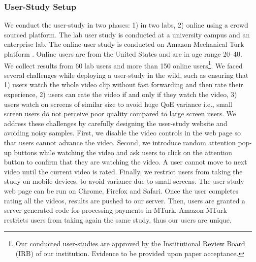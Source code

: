 \subsubsection{User-Study Setup}
We conduct the user-study in two phases: 1) in two labs, 2) online using a crowd sourced platform. The lab user study is conducted at a university campus and an enterprise lab. The online user study is conducted on Amazon Mechanical Turk platform \cite{turk-amazon}. Online users are from the United States and are in age range 20--40. We collect results from 60 lab users and more than 150 online users\footnote{Our conducted user-studies are approved by the Institutional Review Board (IRB) of our institution. Evidence to be provided upon paper acceptance.}. We faced several challenges  while deploying a user-study in the wild, such as ensuring that 1) users watch the whole video clip without fast forwarding and then rate their experience, 2) users can rate the video if and only if they watch the video, 3) users watch on screens of similar size  to avoid huge QoE variance i.e., small screen users do not perceive poor quality compared to large screen users. We address these challenges by carefully designing the user-study website and avoiding noisy samples. First, we disable the video controls in the web page so that users cannot advance the video. Second, we introduce random attention pop-up buttons while watching the video and ask users to click on the attention button to confirm that they are watching the video. A user cannot move to next video until the current video is rated. Finally, we restrict users from taking the study on mobile devices, to avoid variance due to small screens. The user-study web page can be run on Chrome, Firefox and Safari. Once the user completes rating all the videos, results are pushed to our server. Then, users are granted a server-generated code  for processing payments in MTurk. Amazon MTurk restricts users from taking again the same study, thus our users are unique.

